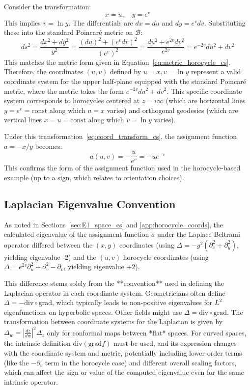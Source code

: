 \documentclass[12pt]{article}
\begin{document}
Consider the transformation:
\begin{equation}
x = u, \quad y = e^v \label{eq:coord_transform_cs}
\end{equation}
This implies \( v = \ln y \). The differentials are \( dx = du \) and \( dy = e^v dv \).
Substituting these into the standard Poincaré metric on \( \mathcal{B} \):
\[
ds^2 = \frac{dx^2 + dy^2}{y^2} = \frac{(du)^2 + (e^v dv)^2}{(e^v)^2} = \frac{du^2 + e^{2v} dv^2}{e^{2v}} = e^{-2v} du^2 + dv^2
\]
This matches the metric form given in Equation~\eqref{eq:metric_horocycle_cs}. Therefore, the coordinates \( (u, v) \) defined by \( u=x, v=\ln y \) represent a valid coordinate system for the upper half-plane equipped with the standard Poincaré metric, where the metric takes the form \( e^{-2v} du^2 + dv^2 \). This specific coordinate system corresponds to horocycles centered at \( z = i \infty \) (which are horizontal lines \( y = e^v = \text{const} \) along which \( u=x \) varies) and orthogonal geodesics (which are vertical lines \( x=u=\text{const} \) along which \( v = \ln y \) varies).

Under this transformation~\eqref{eq:coord_transform_cs}, the assignment function \( a = -x/y \) becomes:
\[
a(u, v) = - \frac{u}{e^v} = -u e^{-v}
\]
This confirms the form of the assignment function used in the horocycle-based example (up to a sign, which relates to orientation choices).

\subsection{Laplacian Eigenvalue Convention}
\label{app:laplacian_convention}

As noted in Sections~\ref{sec:E1_space_cs} and \ref{app:horocycle_coords}, the calculated eigenvalue of the assignment function \( a \) under the Laplace-Beltrami operator differed between the \( (x, y) \) coordinates (using \( \Delta = -y^2(\partial_x^2 + \partial_y^2) \), yielding eigenvalue -2) and the \( (u, v) \) horocycle coordinates (using \( \Delta = e^{2v}\partial_u^2 + \partial_v^2 - \partial_v \), yielding eigenvalue +2).

This difference stems solely from the **convention** used in defining the Laplacian operator in each coordinate system. Geometricians often define \( \Delta = -\text{div} \circ \text{grad} \), which typically leads to non-positive eigenvalues for \( L^2 \) eigenfunctions on hyperbolic spaces. Other fields might use \( \Delta = \text{div} \circ \text{grad} \). The transformation between coordinate systems for the Laplacian is given by \( \Delta_w = |\frac{dz}{dw}|^2 \Delta_z \) only for conformal maps between *flat* spaces. For curved spaces, the intrinsic definition \( \text{div}(\text{grad} f) \) must be used, and its expression changes with the coordinate system and metric, potentially including lower-order terms (like the \( -\partial_v \) term in the horocycle case) and different overall scaling factors, which can affect the sign or value of the computed eigenvalue even for the same intrinsic operator.
\end{document}

